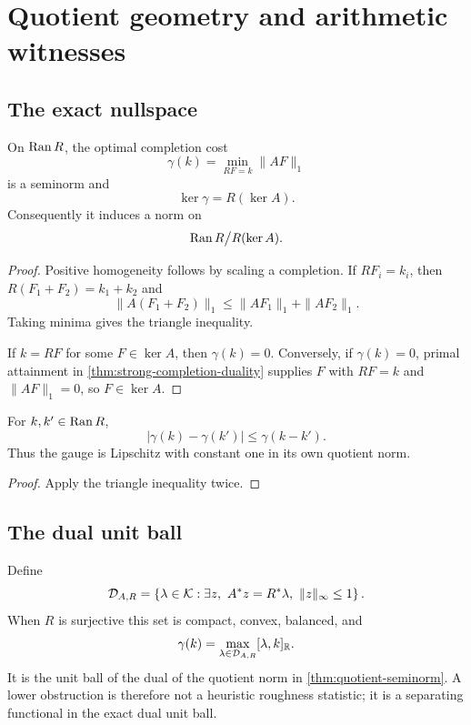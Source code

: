 \section{Quotient geometry and arithmetic witnesses}
\label{sec:quotient-witnesses}

\subsection{The exact nullspace}

\begin{theorem}
\label{thm:quotient-seminorm}
On \(\operatorname{Ran} R\), the optimal completion cost
\[
 \gamma(k)=\min_{RF=k}\|AF\|_1
\]
is a seminorm and
\begin{equation}
 \boxed{\ker\gamma=R(\ker A).}
 \label{eq:gauge-nullspace}
\end{equation}
Consequently it induces a norm on
\[
 \operatorname{Ran} R\big/R(\ker A).
\]
\end{theorem}

\begin{proof}
Positive homogeneity follows by scaling a completion.  If
\(RF_i=k_i\), then \(R(F_1+F_2)=k_1+k_2\) and
\[
 \|A(F_1+F_2)\|_1
 \le \|AF_1\|_1+\|AF_2\|_1.
\]
Taking minima gives the triangle inequality.

If \(k=RF\) for some \(F\in\ker A\), then \(\gamma(k)=0\).
Conversely, if \(\gamma(k)=0\), primal attainment in
\cref{thm:strong-completion-duality} supplies \(F\) with
\(RF=k\) and \(\|AF\|_1=0\), so \(F\in\ker A\).
\end{proof}

\begin{corollary}[Stability]
\label{cor:gauge-stability}
For \(k,k'\in\operatorname{Ran} R\),
\[
 |\gamma(k)-\gamma(k')|
 \le \gamma(k-k').
\]
Thus the gauge is Lipschitz with constant one in its own quotient norm.
\end{corollary}

\begin{proof}
Apply the triangle inequality twice.
\end{proof}

\subsection{The dual unit ball}

Define
\[
 \mathcal D_{A,R}
 =
 \left\{
 \lambda\in\mathcal K:
 \exists z,\ A^*z=R^*\lambda,\ \|z\|_\infty\le1
 \right\}.
\]
When \(R\) is surjective this set is compact, convex, balanced, and
\begin{equation}
 \gamma(k)
 =
 \max_{\lambda\in\mathcal D_{A,R}}
 [\lambda,k]_{\mathbb R}.
 \label{eq:gauge-support-function}
\end{equation}
It is the unit ball of the dual of the quotient norm in
\cref{thm:quotient-seminorm}.  A lower obstruction is therefore not a
heuristic roughness statistic; it is a separating functional in the exact
dual unit ball.

